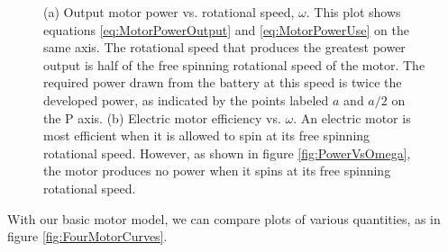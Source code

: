 \begin{figure}[h]		%
\begin{center}
  \hspace{0.05\textwidth}%
\end{center}
\caption[Plot: Electric Motor Power and Efficiency vs. $\omega$.] {(a) Output motor power vs. rotational speed, $\omega$. This plot shows equations \ref{eq:MotorPowerOutput} and \ref{eq:MotorPowerUse} on the same axis. The rotational speed that produces the greatest power output is half of the free spinning rotational speed of the motor. The required power drawn from the battery at this speed is twice the developed power, as indicated by the points labeled $a$ and $a/2$ on the P axis.  (b) Electric motor efficiency vs. $\omega$. An electric motor is most efficient when it is allowed to spin at its free spinning rotational speed. However, as shown in figure \ref{fig:PowerVsOmega}, the motor produces no power when it spins at its free spinning rotational speed.}
\label{fig:MotorPowerAndEfficiency}
\end{figure}
%

With our basic motor model, we can compare plots of various quantities, as in figure \ref{fig:FourMotorCurves}.

